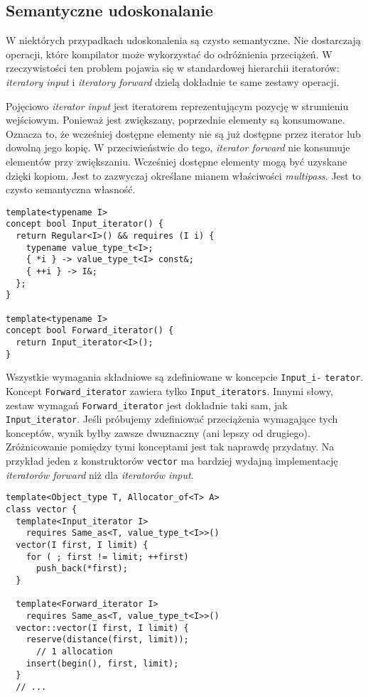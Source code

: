 \documentclass[11pt, a4paper]{article}
\begin{document}
\lstset{language=C++}

\subsection{Semantyczne udoskonalanie}

W niektórych przypadkach udoskonalenia są czysto semantyczne. Nie dostarczają operacji, które kompilator może wykorzystać do odróżnienia przeciążeń. W rzeczywistości ten problem pojawia się w standardowej hierarchii iteratorów: \emph{iteratory input} i \emph{iteratory forward} dzielą dokładnie te same zestawy operacji.

Pojęciowo \emph{iterator input} jest iteratorem reprezentującym pozycję w strumieniu wejściowym. Ponieważ jest zwiększany, poprzednie elementy są konsumowane. Oznacza to, że wcześniej dostępne elementy nie są już dostępne przez iterator lub dowolną jego kopię. W przeciwieństwie do tego, \emph{iterator forward} nie konsumuje elementów przy zwiększaniu. Wcześniej dostępne elementy mogą być uzyskane dzięki kopiom. Jest to zazwyczaj określane mianem właściwości \emph{multipass}. Jest to czysto semantyczna własność.

\begin{lstlisting}[frame=single]
template<typename I>
concept bool Input_iterator() {
  return Regular<I>() && requires (I i) {
    typename value_type_t<I>;
    { *i } -> value_type_t<I> const&;
    { ++i } -> I&;
  };
}

template<typename I>
concept bool Forward_iterator() {
  return Input_iterator<I>();
}
\end{lstlisting}

Wszystkie wymagania składniowe są zdefiniowane w koncepcie \verb#Input_i-# \newline \verb#terator#. Koncept \verb#Forward_iterator# zawiera tylko \verb#Input_iterators#. Innymi słowy, zestaw wymagań \verb#Forward_iterator# jest dokładnie taki sam, jak \verb#Input_iterator#. Jeśli próbujemy zdefiniować przeciążenia wymagające tych konceptów, wynik byłby zawsze dwuznaczny (ani lepszy od drugiego). Zróżnicowanie pomiędzy tymi konceptami jest tak naprawdę przydatny. Na przykład jeden z konstruktorów \verb#vector# ma bardziej wydajną implementację \emph{iteratorów forward} niż dla \emph{iteratorów input}.

\begin{lstlisting}[frame=single]
template<Object_type T, Allocator_of<T> A>
class vector {
  template<Input_iterator I>
    requires Same_as<T, value_type_t<I>>()
  vector(I first, I limit) {
    for ( ; first != limit; ++first)
      push_back(*first);
  }

  template<Forward_iterator I>
    requires Same_as<T, value_type_t<I>>()
  vector::vector(I first, I limit) {
    reserve(distance(first, limit)); 
      // 1 allocation
    insert(begin(), first, limit);
  }
  // ...
\end{lstlisting}
\end{document}
